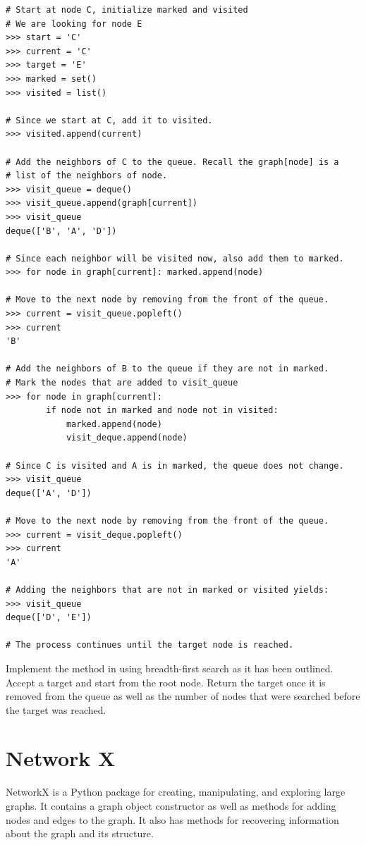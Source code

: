 \begin{lstlisting}
# Start at node C, initialize marked and visited
# We are looking for node E
>>> start = 'C'
>>> current = 'C'
>>> target = 'E'
>>> marked = set()
>>> visited = list()

# Since we start at C, add it to visited.
>>> visited.append(current)

# Add the neighbors of C to the queue. Recall the graph[node] is a
# list of the neighbors of node.
>>> visit_queue = deque()
>>> visit_queue.append(graph[current])
>>> visit_queue
deque(['B', 'A', 'D'])

# Since each neighbor will be visited now, also add them to marked.
>>> for node in graph[current]: marked.append(node) 

# Move to the next node by removing from the front of the queue.
>>> current = visit_queue.popleft()
>>> current
'B'

# Add the neighbors of B to the queue if they are not in marked.
# Mark the nodes that are added to visit_queue
>>> for node in graph[current]:
		if node not in marked and node not in visited:
			marked.append(node)
			visit_deque.append(node)

# Since C is visited and A is in marked, the queue does not change.
>>> visit_queue
deque(['A', 'D'])

# Move to the next node by removing from the front of the queue.
>>> current = visit_deque.popleft()
>>> current
'A'

# Adding the neighbors that are not in marked or visited yields:
>>> visit_queue
deque(['D', 'E'])

# The process continues until the target node is reached.
\end{lstlisting}

\begin{problem}
Implement the  method in  using breadth-first search as it has been outlined.
Accept a target and start from the root node.
Return the target once it is removed from the queue as well as the number of nodes that were searched before the target was reached.
\end{problem}

\section*{Network X}

NetworkX is a Python package for creating, manipulating, and exploring large graphs.
It contains a graph object constructor as well as methods for adding nodes and edges to the graph.
It also has methods for recovering information about the graph and its structure.

